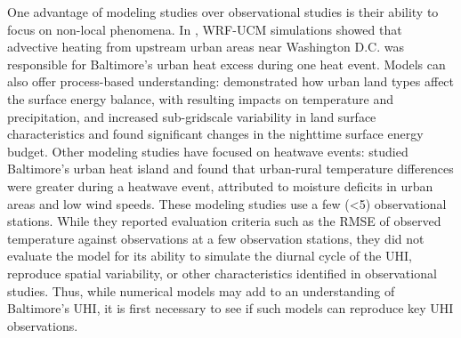 One advantage of 
modeling studies over observational studies is their ability to focus on non-local phenomena.
In
\cite{zhang2011impact}, WRF-UCM simulations showed that advective heating from upstream urban areas near Washington D.C. was responsible for Baltimore's urban heat excess during one heat event. 
Models can also offer process-based understanding: \cite{li2013modeling} demonstrated how urban land types affect the surface energy balance, with resulting impacts on temperature and precipitation, and \cite{li2013development} increased sub-gridscale variability in land surface characteristics and found significant changes in the nighttime surface energy budget. 
Other modeling studies have focused on heatwave events: \cite{li2013synergistic} studied Baltimore's urban heat island and found that urban-rural temperature differences were greater during a heatwave event, attributed to moisture deficits in urban areas and low wind speeds. 
These modeling studies use a few (<5) observational stations. While they reported evaluation criteria such as the RMSE of observed temperature against observations at a few observation stations, they did not evaluate the model for its ability to simulate the diurnal cycle of the UHI, reproduce spatial variability, or other characteristics identified in observational studies. Thus, while numerical models may add to an understanding of Baltimore's UHI, it is first necessary to see if such models can reproduce key UHI observations.


